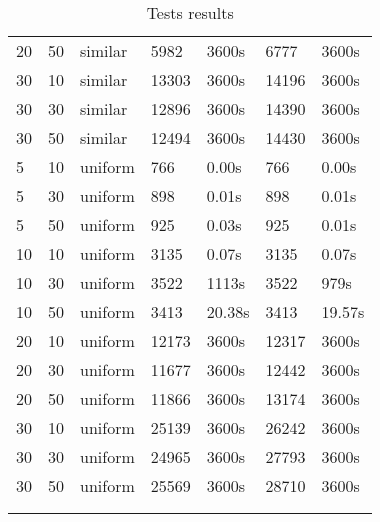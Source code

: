 \begin{scriptsize}
\begin{longtable}{@{\extracolsep{\fill}}lllllll@{}}
 20 & 50 & similar& 5982& 3600s& 6777& 3600s\\
 30 & 10 & similar& 13303& 3600s& 14196& 3600s\\
 30 & 30 & similar& 12896& 3600s& 14390& 3600s\\
 30 & 50 & similar& 12494& 3600s& 14430& 3600s\\
 5 & 10 & uniform& 766& 0.00s& 766& 0.00s \\
 5 & 30 & uniform& 898& 0.01s& 898& 0.01s \\
 5 & 50 & uniform& 925& 0.03s& 925& 0.01s \\
 10 & 10 & uniform& 3135& 0.07s& 3135& 0.07s \\
 10 & 30 & uniform& 3522& 1113s & 3522& 979s \\
 10 & 50 & uniform& 3413& 20.38s& 3413& 19.57s \\
 20 & 10 & uniform& 12173& 3600s& 12317& 3600s\\
 20 & 30 & uniform& 11677& 3600s& 12442& 3600s\\
 20 & 50 & uniform& 11866& 3600s& 13174& 3600s\\
 30 & 10 & uniform& 25139& 3600s& 26242& 3600s\\
 30 & 30 & uniform& 24965& 3600s& 27793& 3600s\\
 30 & 50 & uniform& 25569& 3600s& 28710& 3600s\\
\hline\\ 
\caption{Tests results}\\ 
\end{longtable}
\end{scriptsize}
